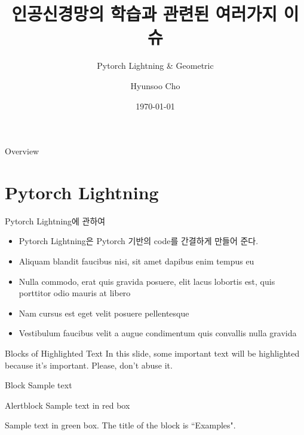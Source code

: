 \documentclass[aspectratio=169,xcolor=dvipsnames]{beamer}
\title[Tips and Tools for ANN and GNN]{인공신경망의 학습과 관련된 여러가지 이슈}
\subtitle{Pytorch Lightning \& Geometric}
\author[Hyunsoo Cho] {Hyunsoo Cho}
\institute[NCIA, SNU] %
{
    Numerical Computing and Image Analysis \\
    Department of Mathematical Sciences \\
    Seoul National University 
    \vskip 3pt
}
\date{\today} %
\begin{document}
\begin{frame}
    \titlepage
\end{frame}

\begin{frame}{Overview}
    \tableofcontents
\end{frame}

\section{Pytorch Lightning}

\begin{frame}{Pytorch Lightning에 관하여}
    \begin{itemize}
        \item Pytorch Lightning은 Pytorch 기반의 code를 간결하게 만들어 준다.
        \item Aliquam blandit faucibus nisi, sit amet dapibus enim tempus eu
        \item Nulla commodo, erat quis gravida posuere, elit lacus lobortis est, quis porttitor odio mauris at libero
        \item Nam cursus est eget velit posuere pellentesque
        \item Vestibulum faucibus velit a augue condimentum quis convallis nulla gravida
    \end{itemize}
\end{frame}


\begin{frame}{Blocks of Highlighted Text}
    In this slide, some important text will be \alert{highlighted} because it's important. Please, don't abuse it.

    \begin{block}{Block}
        Sample text
    \end{block}

    \begin{alertblock}{Alertblock}
        Sample text in red box
    \end{alertblock}

    \begin{examples}
        Sample text in green box. The title of the block is ``Examples".
    \end{examples}
\end{frame}
\end{document}
